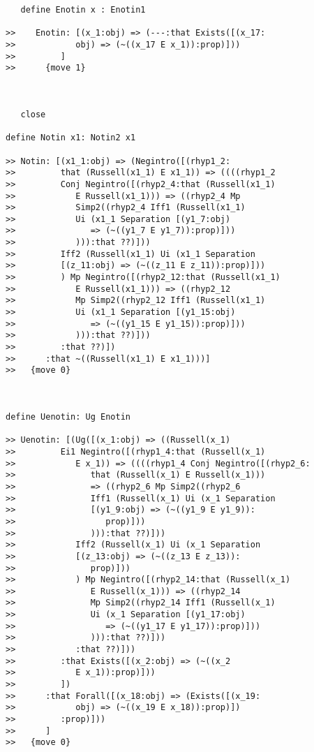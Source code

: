 \documentclass[12pt]{article}
\begin{document}
\begin{verbatim}
   define Enotin x : Enotin1

>>    Enotin: [(x_1:obj) => (---:that Exists([(x_17:
>>            obj) => (~((x_17 E x_1)):prop)]))
>>         ]
>>      {move 1}



   close

define Notin x1: Notin2 x1

>> Notin: [(x1_1:obj) => (Negintro([(rhyp1_2:
>>         that (Russell(x1_1) E x1_1)) => ((((rhyp1_2
>>         Conj Negintro([(rhyp2_4:that (Russell(x1_1)
>>            E Russell(x1_1))) => ((rhyp2_4 Mp
>>            Simp2((rhyp2_4 Iff1 (Russell(x1_1)
>>            Ui (x1_1 Separation [(y1_7:obj)
>>               => (~((y1_7 E y1_7)):prop)]))
>>            ))):that ??)]))
>>         Iff2 (Russell(x1_1) Ui (x1_1 Separation
>>         [(z_11:obj) => (~((z_11 E z_11)):prop)]))
>>         ) Mp Negintro([(rhyp2_12:that (Russell(x1_1)
>>            E Russell(x1_1))) => ((rhyp2_12
>>            Mp Simp2((rhyp2_12 Iff1 (Russell(x1_1)
>>            Ui (x1_1 Separation [(y1_15:obj)
>>               => (~((y1_15 E y1_15)):prop)]))
>>            ))):that ??)]))
>>         :that ??)])
>>      :that ~((Russell(x1_1) E x1_1)))]
>>   {move 0}



define Uenotin: Ug Enotin

>> Uenotin: [(Ug([(x_1:obj) => ((Russell(x_1)
>>         Ei1 Negintro([(rhyp1_4:that (Russell(x_1)
>>            E x_1)) => ((((rhyp1_4 Conj Negintro([(rhyp2_6:
>>               that (Russell(x_1) E Russell(x_1)))
>>               => ((rhyp2_6 Mp Simp2((rhyp2_6
>>               Iff1 (Russell(x_1) Ui (x_1 Separation
>>               [(y1_9:obj) => (~((y1_9 E y1_9)):
>>                  prop)]))
>>               ))):that ??)]))
>>            Iff2 (Russell(x_1) Ui (x_1 Separation
>>            [(z_13:obj) => (~((z_13 E z_13)):
>>               prop)]))
>>            ) Mp Negintro([(rhyp2_14:that (Russell(x_1)
>>               E Russell(x_1))) => ((rhyp2_14
>>               Mp Simp2((rhyp2_14 Iff1 (Russell(x_1)
>>               Ui (x_1 Separation [(y1_17:obj)
>>                  => (~((y1_17 E y1_17)):prop)]))
>>               ))):that ??)]))
>>            :that ??)]))
>>         :that Exists([(x_2:obj) => (~((x_2
>>            E x_1)):prop)]))
>>         ])
>>      :that Forall([(x_18:obj) => (Exists([(x_19:
>>            obj) => (~((x_19 E x_18)):prop)])
>>         :prop)]))
>>      ]
>>   {move 0}


\end{verbatim}
\end{document}
